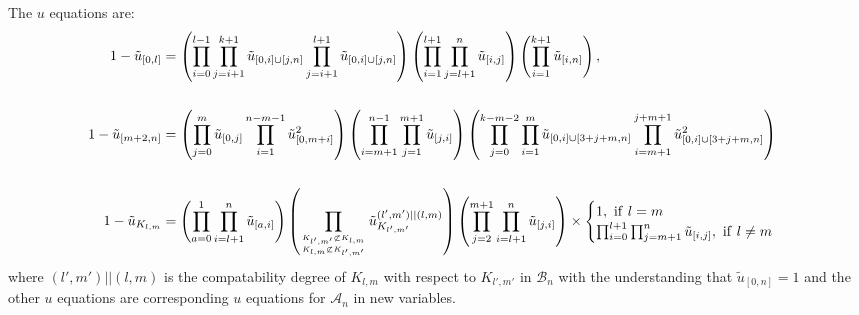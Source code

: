 \documentclass[hidelinks,12pt]{article}
\begin{document}
The $u$ equations are:
\begin{align*}
1-\tilde u_{[0,l]}&=\left(\prod_{i=0}^{l-1} \prod_{j=i+1}^{k+1}  \tilde u_{[0,i]\cup [j,n]} \prod_{j=i+1}^{l+1} \tilde u_{[0,i]\cup [j,n]}\right) \left(\prod_{i=1}^{l+1} \prod_{j=l+1}^{n}\tilde u_{[i,j]} \right) \left(\prod_{i=1}^{k+1} \tilde u_{[i,n]} \right),\\\\
1-\tilde u_{[m+2,n]}&=\left( \prod_{j=0}^{m}\tilde u_{[0,j]} \prod_{i=1}^{n-m-1}\tilde u_{[0,m+i]}^2 \right) \left( \prod_{i=m+1}^{n-1}\prod_{j=1}^{m+1}\tilde u_{[j,i]} \right) \left(\prod_{j=0}^{k-m-2} \prod_{i=1}^{m} \tilde u_{[0,i]\cup [3+j+m, n]} \prod_{i= m+1}^{j+m+1} \tilde u_{[0,i]\cup [3+j+m,n]}^2 \right) \\\\
1-\tilde u_{K_{l,m}}&=\left(\prod_{a=0}^1\prod_{i=l+1}^{n}\tilde u_{[a,i]}\right) \left(\prod_{{\tiny {K_{l',m'} \not\subset K_{l,m}}\atop{K_{l,m} \not\subset K_{l',m'}} }} \tilde u_{K_{l',m'}}^{(l',m')||(l,m)}\right)\left(\prod_{j=2}^{m+1} \prod_{i=l+1}^{n} \tilde u_{[j,i]} \right)\times 
\begin{cases}
 1, ~{\rm if} ~ l=m  \\
 \prod_{i=0}^{l+1} \prod_{j=m+1}^n \tilde u_{[i,j]},~ {\rm if}~l \neq m
\end{cases}
\end{align*}
where $(l',m')||(l,m)$ is the compatability degree of $K_{l,m}$ with respect to $K_{l',m'}$ in $\mathscr B_n$ with the understanding that $\tilde u_{[0,n]}=1$ and the other $u$ equations are corresponding $u$ equations for $\mathscr A_n$ in new variables.



\end{document}
